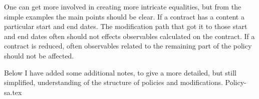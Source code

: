 One can get more involved in creating more intricate equalities, but from the simple examples the main points should be clear.
If a contract has a content a particular start and end dates. The modification path that got it to those start and end dates
often should not effects observables calculated on the contract. If a contract is reduced, often observables related to the
remaining part of the policy should not be affected.


Below I have added some additional notes, to give a more detailed, but still simplified, understanding of
the structure of policies and modifications.
\label{sec:01:2}
{Policy-sa.tex}


